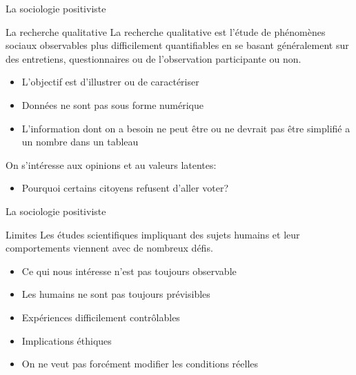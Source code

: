 \documentclass[10pt]{beamer}
\begin{document}
\begin{frame}{La sociologie positiviste}
    \begin{block}{La recherche qualitative}
        La recherche qualitative est l'étude de phénomènes sociaux observables plus difficilement quantifiables en se basant généralement sur des entretiens, questionnaires ou de l'observation participante ou non.
    \begin{itemize}
        \item L'objectif est d'illustrer ou de caractériser
        \item Données ne sont pas sous forme numérique
        \item L'information dont on a besoin ne peut être ou ne devrait pas être simplifié a un nombre dans un tableau
    \end{itemize}
    \end{block}

    On s'intéresse aux opinions et au valeurs latentes:
    \begin{itemize}
        \item Pourquoi certains citoyens refusent d'aller voter?
    \end{itemize}
\end{frame}

\begin{frame}{La sociologie positiviste}
    \begin{block}{Limites}
    Les études scientifiques impliquant des sujets humains et leur comportements viennent avec de nombreux défis.
    \begin{itemize}
        \item Ce qui nous intéresse n'est pas toujours observable
        \item Les humains ne sont pas toujours prévisibles
        \item Expériences difficilement contrôlables
        \item Implications éthiques
        \item On ne veut pas forcément modifier les conditions réelles
    \end{itemize}
    \end{block}
\end{frame}
\end{document}
